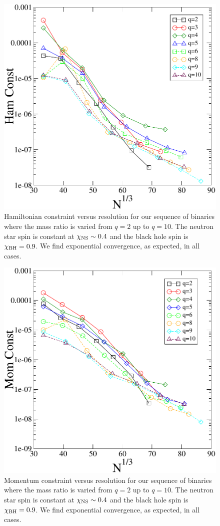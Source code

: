 \begin{figure}
\includegraphics[width=0.95\columnwidth]{chap4/qSeqHam}
\caption[Hamiltonian constraint for the $q$ sequence.]{\label{fig:qSeqHam}Hamiltonian constraint versus resolution for our sequence of binaries where the mass ratio is varied from $q=2$ up to $q=10$. The neutron star spin is constant at $\chi_{\rm NS}\sim 0.4$ and the black hole spin is $\chi_{\rm BH}=0.9$. We find exponential convergence, as expected, in all cases.}
\end{figure}

\begin{figure}
\includegraphics[width=0.95\columnwidth]{chap4/qSeqMom}
\caption[Momemntum constraint for the $q$ sequence.]{\label{fig:qSeqMom}Momentum constraint versus resolution for our sequence of binaries where the mass ratio is varied from $q=2$ up to $q=10$. The neutron star spin is constant at $\chi_{\rm NS}\sim 0.4$ and the black hole spin is $\chi_{\rm BH}=0.9$. We find exponential convergence, as expected, in all cases.}
\end{figure}

